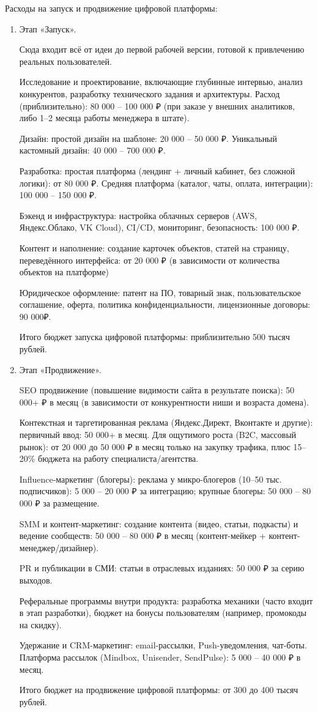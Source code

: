 Расходы на запуск и продвижение цифровой платформы:
\begin{enumerate}
\item Этап «Запуск».

Сюда входит всё от идеи до первой рабочей версии, готовой к привлечению реальных пользователей.

Исследование и проектирование, включающие глубинные интервью, анализ конкурентов, разработку технического задания и архитектуры. Расход (приблизительно):  80 000 – 100 000 ₽ (при заказе у внешних аналитиков, либо 1–2 месяца работы менеджера в штате).

Дизайн: простой дизайн на шаблоне: 20 000 – 50 000 ₽. Уникальный кастомный дизайн: 40 000 – 700 000 ₽.

Разработка: простая платформа (лендинг + личный кабинет, без сложной логики): от 80 000 ₽. Средняя платформа (каталог, чаты, оплата, интеграции): 100 000 – 150 000 ₽.

Бэкенд и инфраструктура: настройка облачных серверов (AWS, Яндекс.Облако, VK Cloud), CI/CD, мониторинг, безопасность: 100 000 ₽.

Контент и наполнение: создание карточек объектов, статей на страницу, переведённого интерфейса: от 20 000 ₽ (в зависимости от количества объектов на платформе)

Юридическое оформление: патент на ПО, товарный знак, пользовательское соглашение, оферта, политика конфиденциальности, лицензионные договоры: 90 000₽.

Итого бюджет запуска цифровой платформы: приблизительно 500 тысяч рублей.

\item Этап «Продвижение».

SEO продвижение (повышение видимости сайта в результате поиска): 50 000+ ₽ в месяц (в зависимости от конкурентности ниши и возраста домена).

Контекстная и таргетированная реклама (Яндекс.Директ, Вконтакте и другие): первичный ввод: 50 000+ в месяц. Для ощутимого роста (B2C, массовый рынок): от 20 000 до 50 000 ₽ в месяц только на закупку трафика, плюс 15–20\% бюджета на работу специалиста/агентства.

Influence-маркетинг (блогеры): реклама у микро-блогеров (10–50 тыс. подписчиков): 5 000 – 20 000 ₽ за интеграцию; крупные блогеры: 50 000 – 80 000 ₽ за размещение.

SMM и контент-маркетинг: создание контента (видео, статьи, подкасты) и ведение сообществ: 50 000 – 80 000 ₽ в месяц (контент-мейкер + контент-менеджер/дизайнер).

PR и публикации в СМИ: статьи в отраслевых изданиях: 50 000  ₽ за серию выходов.

Реферальные программы внутри продукта: разработка механики (часто входит в этап разработки), бюджет на бонусы пользователям (например, промокоды на скидку).

Удержание и CRM-маркетинг: email-рассылки, Push-уведомления, чат-боты. Платформа рассылок (Mindbox, Unisender, SendPulse): 5 000 – 40 000 ₽ в месяц.

Итого бюджет на продвижение цифровой платформы: от 300 до 400 тысяч рублей.
\end{enumerate}

